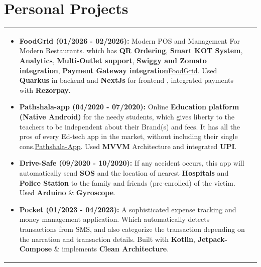 \documentclass[a4paper,8pt]{article}
\begin{document}
\section{Personal Projects} \begin{tabularx}{\linewidth}{ @{}l r@{} } \begin{minipage}[t]{\linewidth} \begin{itemize}[nosep,after=\strut, leftmargin=2em, itemsep=2pt] \item \textbf{FoodGrid (01/2026 - 02/2026):} Modern POS and Management For Modern Restaurants. which has \textbf{QR Ordering}, \textbf{Smart KOT System}, \textbf{Analytics}, \textbf{Multi-Outlet support}, \textbf{Swiggy and Zomato integration}, \textbf{Payment Gateway integration}\href{https://github.com/cureius/FoodGrid}{\textcolor[HTML]{371e77}{FoodGrid}}. Used \textbf{Quarkus} in backend and \textbf{NextJs} for frontend , integrated payments with \textbf{Rezorpay}. \item \textbf{Pathshala-app (04/2020 - 07/2020):} Online \textbf{Education} \textbf{platform} \textbf{(Native Android)} for the needy students, which gives liberty to the teachers to be independent about their Brand(s) and fees. It has all the pros of every Ed-tech app in the market, without including their single cons.\href{https://github.com/cureius/pathshala-app}{\textcolor[HTML]{371e77}{Pathshala-App}}. Used \textbf{MVVM} Architecture and integrated \textbf{UPI}. \item \textbf{Drive-Safe (09/2020 - 10/2020):} If any accident occurs, this app will automatically send \textbf{SOS} and the location of nearest \textbf{Hospitals} and \textbf{Police Station} to the family and friends (pre-enrolled) of the victim. Used \textbf{Arduino} \& \textbf{Gyroscope}. \item \textbf{Pocket (01/2023 - 04/2023):} A sophisticated expense tracking and money management application. Which automatically detects transactions from SMS, and also categorize the transaction depending on the narration and transaction details. Built with \textbf{Kotlin}, \textbf{Jetpack-Compose} \& implements \textbf{Clean Architecture}. \end{itemize} \end{minipage} \end{tabularx} 
\end{document}
